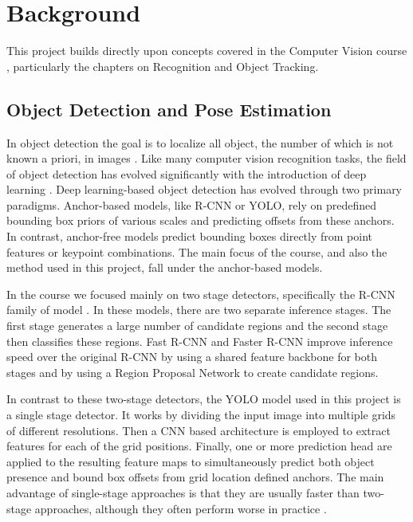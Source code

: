 
\section{Background} \label{background}

This project builds directly upon concepts covered in the Computer Vision course \parencite{Lanz2026Notes}, particularly the chapters on Recognition and Object Tracking.

\subsection{Object Detection and Pose Estimation} \label{detection}

In object detection the goal is to localize all object, the number of which is not known a priori, in images \parencite[p. 122-128]{Lanz2026Notes}. Like many computer vision recognition tasks, the field of object detection has evolved significantly with the introduction of deep learning \parencite[p. 113]{Lanz2026Notes}. Deep learning-based object detection has evolved through two primary paradigms. Anchor-based models, like R-CNN or YOLO, rely on predefined bounding box priors of various scales and predicting offsets from these anchors. In contrast, anchor-free models predict bounding boxes directly from point features or keypoint combinations. The main focus of the course, and also the method used in this project, fall under the anchor-based models.

In the course we focused mainly on two stage detectors, specifically the R-CNN family of model \parencite[p. 125-127]{Lanz2026Notes}. In these models, there are two separate inference stages. The first stage generates a large number of candidate regions and the second stage then classifies these regions. Fast R-CNN \parencite{girshick2015fast} and Faster R-CNN \parencite{ren2015faster} improve inference speed over the original R-CNN by using a shared feature backbone for both stages and by using a Region Proposal Network to create candidate regions.

In contrast to these two-stage detectors, the YOLO model used in this project is a single stage detector. It works by dividing the input image into multiple grids of different resolutions. Then a CNN based architecture is employed to extract features for each of the grid positions. Finally, one or more prediction head are applied to the resulting feature maps to simultaneously predict both object presence and bound box offsets from grid location defined anchors. The main advantage of single-stage approaches is that they are usually faster than two-stage approaches, although they often perform worse in practice \parencite[p. 126-127]{Lanz2026Notes}.

